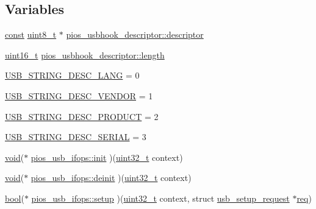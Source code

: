 \subsection*{Variables}
\begin{DoxyCompactItemize}
\item 
\hyperlink{group___n_a_m_e_ga7ae6d0e43244213b34de2c2b9aa30da6}{const} \hyperlink{stdint_8h_aba7bc1797add20fe3efdf37ced1182c5}{uint8\-\_\-t} $\ast$ \hyperlink{group___p_i_o_s___u_s_b_h_o_o_k_ga56ff6e20a77e4421c8c47442ca13d75b}{pios\-\_\-usbhook\-\_\-descriptor\-::descriptor}
\item 
\hyperlink{stdint_8h_a273cf69d639a59973b6019625df33e30}{uint16\-\_\-t} \hyperlink{group___p_i_o_s___u_s_b_h_o_o_k_ga9cc49b35b49236ac74e747d179a3650f}{pios\-\_\-usbhook\-\_\-descriptor\-::length}
\item 
\hyperlink{group___p_i_o_s___u_s_b_h_o_o_k_gac5f1f2d3bae1b6b5b9912f0fdd72dc93}{U\-S\-B\-\_\-\-S\-T\-R\-I\-N\-G\-\_\-\-D\-E\-S\-C\-\_\-\-L\-A\-N\-G} = 0
\item 
\hyperlink{group___p_i_o_s___u_s_b_h_o_o_k_ga05f051e48c96e9d6d2e05804c8023fe2}{U\-S\-B\-\_\-\-S\-T\-R\-I\-N\-G\-\_\-\-D\-E\-S\-C\-\_\-\-V\-E\-N\-D\-O\-R} = 1
\item 
\hyperlink{group___p_i_o_s___u_s_b_h_o_o_k_ga80dce006aa14f2a9412e8ee68b4627b0}{U\-S\-B\-\_\-\-S\-T\-R\-I\-N\-G\-\_\-\-D\-E\-S\-C\-\_\-\-P\-R\-O\-D\-U\-C\-T} = 2
\item 
\hyperlink{group___p_i_o_s___u_s_b_h_o_o_k_ga1c1263ee96f36ccbfc0e662b85e044bf}{U\-S\-B\-\_\-\-S\-T\-R\-I\-N\-G\-\_\-\-D\-E\-S\-C\-\_\-\-S\-E\-R\-I\-A\-L} = 3
\item 
\hyperlink{group___n_a_m_e_ga18028b8badbf1ea7e704ccac3c488e82}{void}($\ast$ \hyperlink{group___p_i_o_s___u_s_b_h_o_o_k_ga08614658e728cfb81cb4091e3e210624}{pios\-\_\-usb\-\_\-ifops\-::init} )(\hyperlink{stdint_8h_a435d1572bf3f880d55459d9805097f62}{uint32\-\_\-t} context)
\item 
\hyperlink{group___n_a_m_e_ga18028b8badbf1ea7e704ccac3c488e82}{void}($\ast$ \hyperlink{group___p_i_o_s___u_s_b_h_o_o_k_ga23c8bc133e24838b490c81a9d47318d4}{pios\-\_\-usb\-\_\-ifops\-::deinit} )(\hyperlink{stdint_8h_a435d1572bf3f880d55459d9805097f62}{uint32\-\_\-t} context)
\item 
\hyperlink{group___exported__types_gaf6a258d8f3ee5206d682d799316314b1}{bool}($\ast$ \hyperlink{group___p_i_o_s___u_s_b_h_o_o_k_gafc58e776c6ff79a3974ca6dc1decf467}{pios\-\_\-usb\-\_\-ifops\-::setup} )(\hyperlink{stdint_8h_a435d1572bf3f880d55459d9805097f62}{uint32\-\_\-t} context, struct \hyperlink{structusb__setup__request}{usb\-\_\-setup\-\_\-request} $\ast$\hyperlink{pios__opahrs__proto_8h_ad651fd9affe5ed0ac9abccd8e2791a2c}{req})

\end{DoxyCompactItemize}
